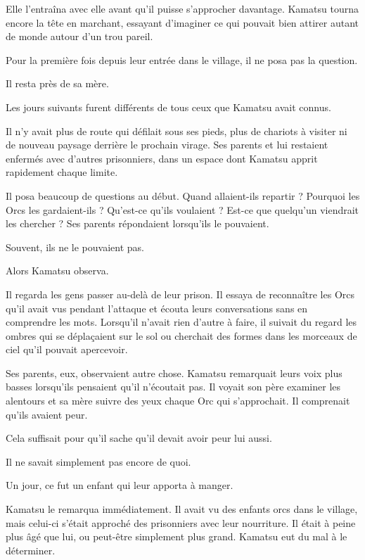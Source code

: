 Elle l'entraîna avec elle avant qu'il puisse s'approcher davantage. Kamatsu
tourna encore la tête en marchant, essayant d'imaginer ce qui pouvait bien
attirer autant de monde autour d'un trou pareil.

Pour la première fois depuis leur entrée dans le village, il ne posa pas la
question.

Il resta près de sa mère.

\scenebreak

Les jours suivants furent différents de tous ceux que Kamatsu avait connus.

Il n'y avait plus de route qui défilait sous ses pieds, plus de chariots à
visiter ni de nouveau paysage derrière le prochain virage. Ses parents et lui
restaient enfermés avec d'autres prisonniers, dans un espace dont Kamatsu
apprit rapidement chaque limite.

Il posa beaucoup de questions au début. Quand allaient-ils repartir ? Pourquoi
les Orcs les gardaient-ils ? Qu'est-ce qu'ils voulaient ? Est-ce que quelqu'un
viendrait les chercher ? Ses parents répondaient lorsqu'ils le pouvaient.

Souvent, ils ne le pouvaient pas.

Alors Kamatsu observa.

Il regarda les gens passer au-delà de leur prison. Il essaya de reconnaître les
Orcs qu'il avait vus pendant l'attaque et écouta leurs conversations sans en
comprendre les mots. Lorsqu'il n'avait rien d'autre à faire, il suivait du
regard les ombres qui se déplaçaient sur le sol ou cherchait des formes dans
les morceaux de ciel qu'il pouvait apercevoir.

Ses parents, eux, observaient autre chose. Kamatsu remarquait leurs voix plus
basses lorsqu'ils pensaient qu'il n'écoutait pas. Il voyait son père examiner
les alentours et sa mère suivre des yeux chaque Orc qui s'approchait. Il
comprenait qu'ils avaient peur.

Cela suffisait pour qu'il sache qu'il devait avoir peur lui aussi.

Il ne savait simplement pas encore de quoi.

Un jour, ce fut un enfant qui leur apporta à manger.

Kamatsu le remarqua immédiatement. Il avait vu des enfants orcs dans le
village, mais celui-ci s'était approché des prisonniers avec leur nourriture.
Il était à peine plus âgé que lui, ou peut-être simplement plus grand. Kamatsu
eut du mal à le déterminer.

